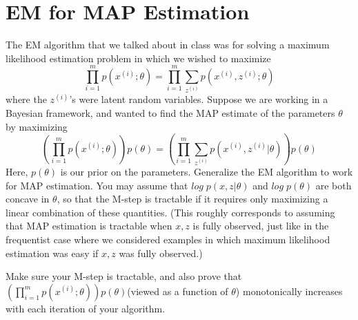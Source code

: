 \documentclass{article}
\theoremstyle{definition}
\theoremstyle{definition}
\theoremstyle{remark}
\begin{document}
\section*{EM for MAP Estimation}
The EM algorithm that we talked about in class was for solving a maximum likelihood estimation problem in which we wished to maximize
\begin{equation}
  \prod_{i = 1}^mp(x^{(i)};\theta) = \prod_{i = 1}^m \sum_{z^{(i)}}p(x^{(i)},z^{(i)};\theta)
\end{equation}
where the $z^{(i)}$'s were latent random variables. Suppose we are working in a Bayesian framework, and wanted to find the MAP estimate of the parameters $\theta$ by maximizing
\begin{equation}
  (\prod_{i = 1}^mp(x^{(i)};\theta))p(\theta) = (\prod_{i = 1}^m \sum_{z^{(i)}}p(x^{(i)},z^{(i)}|\theta))p(\theta)
\end{equation}
Here, $p(\theta)$ is our prior on the parameters. Generalize the EM algorithm to work for MAP
estimation. You may assume that $log\;p(x,z|\theta)$ and $log\;p(\theta)$ are both concave in $\theta$, so
that the M-step is tractable if it requires only maximizing a linear combination of these
quantities. (This roughly corresponds to assuming that MAP estimation is tractable when
$x, z$ is fully observed, just like in the frequentist case where we considered examples in
which maximum likelihood estimation was easy if $x, z$ was fully observed.)

Make sure your M-step is tractable, and also prove that $(\prod_{i = 1}^mp(x^{(i)};\theta))p(\theta)$(viewed as a
function of $\theta$) monotonically increases with each iteration of your algorithm.
\end{document}

